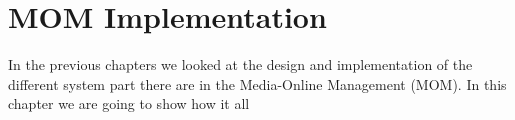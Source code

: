 \chapter{MOM Implementation}

In the previous chapters we looked at the design and implementation of the different system part there are in the Media-Online Management (MOM).
In this chapter we are going to show how it all  